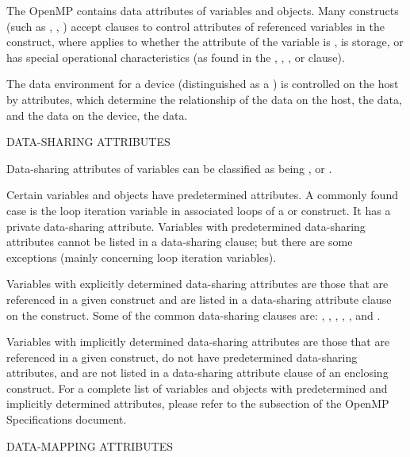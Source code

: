 \label{chap:data_environment}
The OpenMP  contains data attributes of variables and
objects.  Many constructs (such as , , ) 
accept clauses to control  attributes
of referenced variables in the construct, where  applies to
whether the attribute of the variable is , 
is  storage, or has special operational characteristics 
(as found in the , , , or  clause).

The data environment for a device (distinguished as a )
is controlled on the host by  attributes, which determine the
relationship of the data on the host, the  data, and the data on the
device, the  data.

\bigskip
DATA-SHARING ATTRIBUTES

Data-sharing attributes of variables can be classified as being ,
 or .

Certain variables and objects have predetermined attributes.  
A commonly found case is the loop iteration variable in associated loops 
of a  or  construct. It has a private data-sharing attribute.
Variables with predetermined data-sharing attributes cannot be listed in a data-sharing clause; but there are some
exceptions (mainly concerning loop iteration variables).

Variables with explicitly determined data-sharing attributes are those that are
referenced in a given construct and are listed in a data-sharing attribute
clause on the construct. Some of the common data-sharing clauses are:
, , , , 
, and . %

Variables with implicitly determined data-sharing attributes are those
that are referenced in a given construct, do not have predetermined
data-sharing attributes, and are not listed in a data-sharing
attribute clause of an enclosing construct.
For a complete list of variables and objects with predetermined and
implicitly determined attributes, please refer to the
subsection of the OpenMP Specifications document.  

\bigskip
DATA-MAPPING ATTRIBUTES

